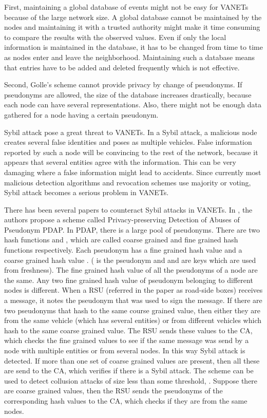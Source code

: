 \documentclass[conference]{IEEEtran}[10pt]
\begin{document}
First, maintaining a global database of events  might not be easy for VANETs because of the large network size. 
A global database cannot be maintained by the nodes and maintaining it with
a trusted authority might make it time consuming to compare the results with the observed values. 
Even if only the local information is maintained in the database, it has to be changed from time to time
as nodes enter and leave the neighborhood. 
Maintaining such a database means that entries have to be added and deleted frequently which is not effective. 

Second, Golle's scheme cannot provide privacy by change of pseudonyms. 
If pseudonyms are allowed, the size of the database increases drastically, because each node can have several representations.
Also, there might not be enough data gathered for a node having a certain pseudonym. 

Sybil attack \cite{D02} pose a great threat to VANETs.
In a Sybil attack, a malicious node creates several false identities and poses as multiple vehicles. 
False information reported by such a node will be convincing to the rest of the network, because
it appears that several entities agree with the information. 
This can be very damaging where a false information might lead to accidents. 
Since currently most malicious detection algorithms and revocation schemes use majority or voting, 
Sybil attack becomes a serious problem in VANETs. 

There has been several papers to counteract Sybil attacks  in VANETs. 
In \cite{ZCNC07}, the authors propose a scheme called Privacy-preserving Detection of Abuses of Pseudonym PDAP. 
In PDAP, there is a large pool of pseudonyms. 
There are two hash functions  and , which are  called coarse grained and fine grained hash functions respectively. 
Each pseudonym has a fine grained hash value  and a coarse grained hash value .
( is the pseudonym and  and  are keys which are used from freshness). 
The fine grained hash value of all the pseudonyms of a node are the same. 
Any two fine grained hash value of pseudonym belonging to different nodes is different. 
When a RSU (referred in the paper as road-side boxes) receives a message, it notes the pseudonym that was used to
sign the message. 
If there are two pseudonyms that hash to the same course grained value, then either they are from the same vehicle (which
has several entities) or from different vehicles which hash to the same coarse grained value. 
The RSU sends these values to the CA, which checks the fine grained values to see if the same message
was send by a node with multiple entities or from several nodes.  
In this way Sybil attack is detected. 
If more than one set of coarse grained values are present, then all these are send to the CA, which verifies if there is a Sybil attack. 
The scheme can be used to detect collusion attacks of size less than some threshold, . 
Suppose there are  coarse grained values, 
then the RSU sends the pseudonyms of the corresponding hash values to the CA, which checks if they are from the same nodes. 
\end{document}
